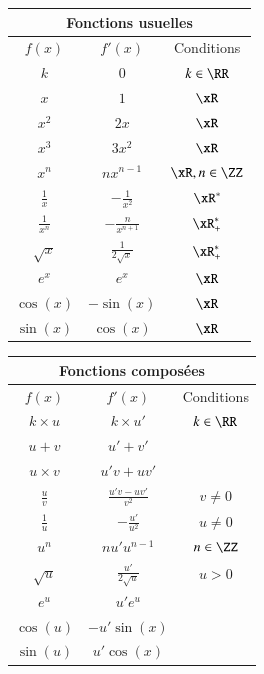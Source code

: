 \documentclass[oneside,12pt]{article}
\begin{document}
\begin{minipage}[t]{0.45\linewidth}
\center \large
\renewcommand{\arraystretch}{1.5}
\begin{tabular}{ | c | c | c |}
    \hline
    \multicolumn{3}{|c|}{\textbf{Fonctions usuelles}} \\ \hline \hline
    $f(x)$ & $f'(x)$ & Conditions \\ \hline \hline
    $k$ & $0$ & $k\in\RR$ \\ \hline
    $x$ & $1$& $\xR$\\ \hline
    $x^{2}$ & $2x$& $\xR$\\ \hline
    $x^{3}$ & $3x^{2}$& $\xR$\\ \hline
    $x^{n}$ & $nx^{n-1}$ & $\xR , n\in \ZZ$\\ \hline
    $\frac{1}{x}$ & $-\frac{1}{x^{2}}$ & $\xR^{*}$ \\ \hline
    $\frac{1}{x^{n}}$ & $-\frac{n}{x^{n+1}}$ & $\xR_{+}^{*}$ \\ \hline
    $\sqrt{x}$ & $\frac{1}{2\sqrt{x}}$ & $\xR^{*}_{+}$ \\ \hline
    $e^{x}$ & $e^{x}$ & $\xR$ \\ \hline
    $\cos(x)$ &  $-\sin(x)$ & $\xR$ \\ \hline
    $\sin(x)$ & $\cos(x)$ & $\xR$ \\ \hline
    \end{tabular}

\end{minipage} \hfill
\begin{minipage}[t]{0.55\linewidth}
\center \large
\renewcommand{\arraystretch}{1.6}
\begin{tabular}{ | c | c | c |}
    \hline
    \multicolumn{3}{|c|}{\textbf{Fonctions composées}} \\ \hline\hline
    $f(x)$ & $f'(x)$ & Conditions \\ \hline \hline
    $k\times u$ & $k\times u'$ & $k\in\RR$ \\ \hline
    $u+v$ & $u'+v'$ & \\ \hline
    $u\times v$ & $u'v+uv'$& \\ \hline
    $\frac{u}{v}$ & $\frac{u'v-uv'}{v^{2}}$& $v\neq 0$\\ \hline
    $\frac{1}{u}$ & $-\frac{u'}{u^2}$ & $u\neq0$ \\ \hline
    $u^{n}$ & $n  u'  u^{n-1}$ & $n\in \ZZ$\\ \hline
    $\sqrt{u}$ & $\frac{u'}{2\sqrt{u}}$ & $u > 0$ \\ \hline
    $e^{u}$ & $u'e^{u}$ &  \\ \hline
    $\cos(u)$ &  $-u'\sin(x)$ & \\ \hline
    $\sin(u)$ & $u'\cos(x)$ & \\ \hline
\end{tabular} \\[15pt]
\end{minipage}
\end{document}
